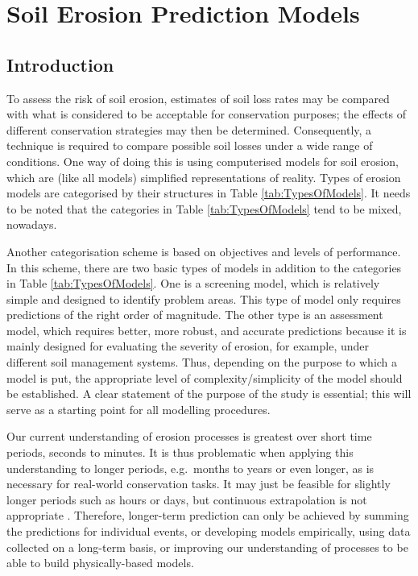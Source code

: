 \section{Soil Erosion Prediction Models}
\label{sec:SoilErosionPredictionModels}

\subsection{Introduction}
\label{sec:Introductionerosionmodels}

To assess the risk of soil erosion, estimates of soil loss rates may be compared
with what is considered to be acceptable for conservation purposes; the effects
of different conservation strategies may then be determined. Consequently, a
technique is required to compare possible soil losses under a wide range of
conditions. One way of doing this is using computerised models for soil erosion,
which are (like all models) simplified representations of reality. Types of
erosion models are categorised by their structures in Table
\ref{tab:TypesOfModels}. It needs to be noted that the categories in Table
\ref{tab:TypesOfModels} tend to be mixed, nowadays.

Another categorisation scheme is based on objectives and levels of performance.
In this scheme, there are two basic types of models in addition to the
categories in Table \ref{tab:TypesOfModels}. One is a screening model, which is
relatively simple and designed to identify problem areas. This type of model
only requires predictions of the right order of magnitude. The other type is an
assessment model, which requires better, more robust, and accurate predictions
because it is mainly designed for evaluating the severity of erosion, for
example, under different soil management systems. Thus, depending on the purpose
to which a model is put, the appropriate level of complexity/simplicity of
the model should be established. A clear statement of the purpose of the study
is essential; this will serve as a starting point for all modelling procedures.

Our current understanding of erosion processes is greatest over short time
periods, seconds to minutes. It is thus problematic when applying this
understanding to longer periods, e.g.\ months to years or even longer, as is
necessary for real-world conservation tasks. It may just be feasible for
slightly longer periods such as hours or days, but continuous extrapolation is
not appropriate \citep{kirkby1992-180,morgan1995-soil}. Therefore, longer-term
prediction can only be achieved by summing the predictions for individual
events, or developing models empirically, using data collected on a long-term
basis, or improving our understanding of processes to be able to build
physically-based models.

